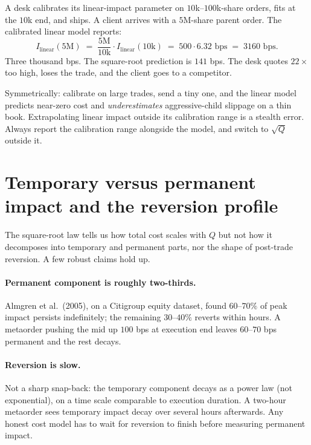\begin{pitfallbox}
A desk calibrates its linear-impact parameter on $10$k--$100$k-share
orders, fits at the $10$k end, and ships. A client arrives with a
$5$M-share parent order. The calibrated linear model reports:
\[
  I_{\text{linear}}(5\text{M}) \;=\; \frac{5\text{M}}{10\text{k}} \cdot I_{\text{linear}}(10\text{k})
  \;=\; 500 \cdot 6.32\text{ bps} \;=\; 3160\text{ bps}.
\]
Three thousand bps. The square-root prediction is $141$ bps. The
desk quotes $22\times$ too high, loses the trade, and the client
goes to a competitor.

Symmetrically: calibrate on large trades, send a tiny one, and the
linear model predicts near-zero cost and \emph{underestimates}
aggressive-child slippage on a thin book. Extrapolating linear
impact outside its calibration range is a stealth error. Always
report the calibration range alongside the model, and switch to
$\sqrt{Q}$ outside it.
\end{pitfallbox}

\section{Temporary versus permanent impact and the reversion profile}
\label{sec:temp_perm_profile}

The square-root law tells us how total cost scales with $Q$ but not
how it decomposes into temporary and permanent parts, nor the shape
of post-trade reversion. A few robust claims hold up.

\paragraph{Permanent component is roughly two-thirds.}
Almgren et al.~(2005), on a Citigroup equity dataset, found
$60$--$70\%$ of peak impact persists indefinitely; the remaining
$30$--$40\%$ reverts within hours. A metaorder pushing the mid up
$100$ bps at execution end leaves $60$--$70$ bps permanent and the
rest decays.

\paragraph{Reversion is slow.}
Not a sharp snap-back: the temporary component decays as a power law
(not exponential), on a time scale comparable to execution duration.
A two-hour metaorder sees temporary impact decay over several hours
afterwards. Any honest cost model has to wait for reversion to
finish before measuring permanent impact.


